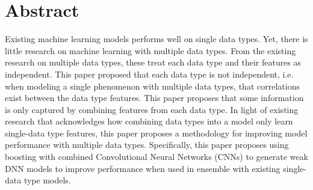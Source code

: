 
\section{Abstract}

Existing machine learning models performs well on single data types.  Yet, there is little research on machine learning with multiple data types.  From the existing research on multiple data types, these treat each data type and their features as independent.  This paper proposed that each data type is not independent, i.e. when modeling a single phenomenon with multiple data types, that correlations exist between the data type features. This paper proposes that some information is only captured by combining features from each data type.  In light of existing research that acknowledges how combining data types into a model only learn single-data type features, this paper proposes a methodology for improving model performance with multiple data types.  Specifically, this paper proposes using boosting with combined Convolutional Neural Networks (CNNs) to generate weak DNN models to improve performance when used in ensemble with existing single-data type models.












